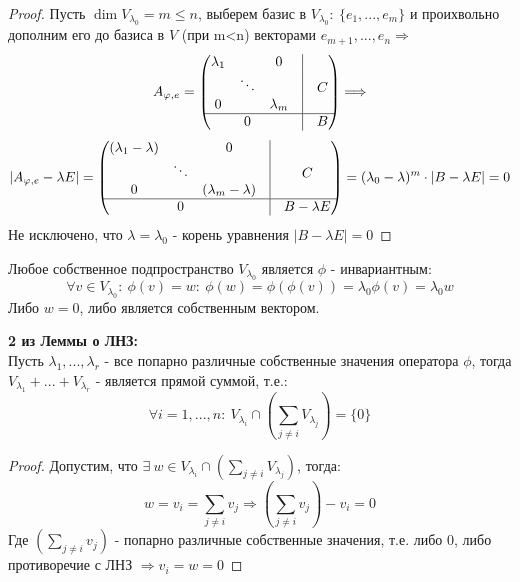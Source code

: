     \begin{proof}
        Пусть $\dim V_{\lambda_0} = m \leq n$, выберем базис в $V_{\lambda_0}: \ \{e_1,...,e_m\}$ и проихвольно дополним его до базиса в $V$ (при m<n) векторами $e_{m+1},...,e_n \Longrightarrow$
        $$A_{\phi,e} = \begin{pmatrix}
            \lambda_1 & \null & 0 & \vline & \null \\
            \null & \ddots & \null & \vline & C \\
            0 & \null & \lambda_m & \vline & \null \\
            \hline
            \null & 0 & \null & \vline & B
        \end{pmatrix} \Longrightarrow $$
        $$|A_{\phi,e} - \lambda E| = \begin{pmatrix}
            (\lambda_1 - \lambda) & \null & 0 & \vline & \null \\
            \null & \ddots & \null & \vline & C \\
            0 & \null & (\lambda_m - \lambda) & \vline & \null \\
            \hline
            \null & 0 & \null & \vline & B - \lambda E
        \end{pmatrix} = (\lambda_0-\lambda)^m\cdot |B-\lambda E|=0$$
        Не исключено, что $\lambda = \lambda_0$ - корень уравнения $|B-\lambda E| =0 $       
    \end{proof} 
    \begin{remark}
        Любое собственное подпространство $V_{\lambda_0}$ является $\phi$ - инвариантным:
        $$\forall v \in V_{\lambda_0}: \ \phi(v) = w: \ \phi(w) = \phi(\phi(v)) = \lambda_0 \phi(v) = \lambda_0 w$$
        Либо $w=0$, либо является собственным вектором.   
    \end{remark}
    \begin{consequense} \textbf{2 из Леммы о ЛНЗ:} \\
        Пусть $\lambda_1,...,\lambda_r$ - все попарно различные собственные значения оператора $\phi$, тогда $V_{\lambda_1} + ... + V_{\lambda_r}$ - является прямой суммой, т.е.:
        $$\forall i = 1,...,n: \  V_{\lambda_i} \cap (\sum \limits_{j\neq i}V_{\lambda_j}) = \{0\}$$   
    \end{consequense}
    \begin{proof}
        Допустим, что $\exists \ w \in V_{\lambda_i} \cap (\sum \limits_{j\neq i}V_{\lambda_j})$, тогда: 
        $$w = v_i = \sum \limits_{j\neq i}v_j \Longrightarrow (\sum \limits_{j\neq i}v_j) - v_i = 0$$
        Где $(\sum \limits_{j\neq i}v_j)$ - попарно различные собственные значения, т.е. либо $0$, либо противоречие с ЛНЗ $\Longrightarrow v_i = w = 0$    
    \end{proof}
